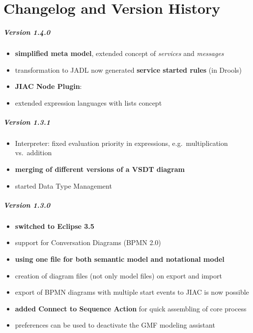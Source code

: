 \chapter{Changelog and Version History}
\label{sec:changelog}


\paragraph{Version 1.4.0}

\begin{itemize}
	\item \textbf{simplified meta model}, extended concept of \emph{services} and \emph{messages}
	\item transformation to JADL now generated \textbf{service started rules} (in Drools)
	\item \textbf{JIAC Node Plugin}: 
	\item extended expression languages with lists concept
\end{itemize}

\paragraph{Version 1.3.1}
\begin{itemize}
	\item Interpreter: fixed evaluation priority in expressions, e.g.\ multiplication vs.\ addition
	\item \textbf{merging of different versions of a VSDT diagram}
	\item started Data Type Management
\end{itemize}

\paragraph{Version 1.3.0}
\begin{itemize}
	\item \textbf{switched to Eclipse 3.5}
	\item support for Conversation Diagrams (BPMN 2.0)
	\item \textbf{using one file for both semantic model and notational model}
	\item creation of diagram files (not only model files) on export and import
	\item export of BPMN diagrams with multiple start events to JIAC is now possible
	\item \textbf{added Connect to Sequence Action} for quick assembling of core process
	\item preferences can be used to deactivate the GMF modeling assistant
\end{itemize}

